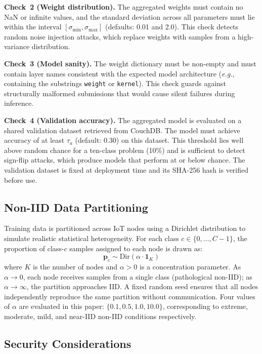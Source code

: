 \documentclass[lettersize,journal]{IEEEtran}
\newcommand{\eg}{\textit{e.g.}}
\begin{document}
\textbf{Check~2 (Weight distribution).} The aggregated weights must contain no NaN or
infinite values, and the standard deviation across all parameters must lie within the
interval $[\sigma_{\min}, \sigma_{\max}]$ (defaults: 0.01 and 2.0). This check detects
random noise injection attacks, which replace weights with samples from a high-variance
distribution.

\textbf{Check~3 (Model sanity).} The weight dictionary must be non-empty and must contain
layer names consistent with the expected model architecture (\eg, containing the substrings
\texttt{weight} or \texttt{kernel}). This check guards against structurally malformed
submissions that would cause silent failures during inference.

\textbf{Check~4 (Validation accuracy).} The aggregated model is evaluated on a shared
validation dataset retrieved from CouchDB. The model must achieve accuracy of at least
$\tau_a$ (default: 0.30) on this dataset. This threshold lies well above random chance for
a ten-class problem (10\%) and is sufficient to detect sign-flip attacks, which produce
models that perform at or below chance. The validation dataset is fixed at deployment time
and its SHA-256 hash is verified before use.

\subsection{Non-IID Data Partitioning}

Training data is partitioned across IoT nodes using a Dirichlet distribution to simulate
realistic statistical heterogeneity. For each class $c \in \{0, \ldots, C{-}1\}$, the
proportion of class-$c$ samples assigned to each node is drawn as:
\begin{equation}
    \mathbf{p}_c \sim \mathrm{Dir}(\alpha \cdot \mathbf{1}_K)
    \label{eq:dirichlet}
\end{equation}
where $K$ is the number of nodes and $\alpha > 0$ is a concentration parameter. As
$\alpha \to 0$, each node receives samples from a single class (pathological non-IID); as
$\alpha \to \infty$, the partition approaches IID. A fixed random seed ensures that all
nodes independently reproduce the same partition without communication. Four values of
$\alpha$ are evaluated in this paper: $\{0.1, 0.5, 1.0, 10.0\}$, corresponding to extreme,
moderate, mild, and near-IID non-IID conditions respectively.

\subsection{Security Considerations}
\end{document}
